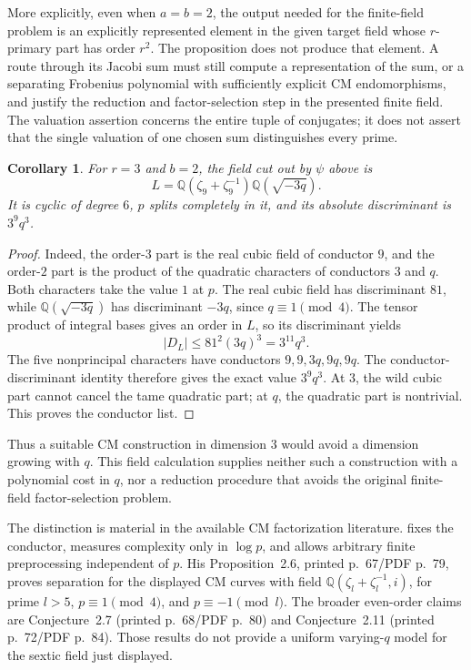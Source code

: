\documentclass[11pt]{article}
\newtheorem{corollary}[theorem]{Corollary}
\theoremstyle{definition}
\theoremstyle{remark}
\begin{document}
More explicitly, even when \(a=b=2\), the output needed for the
finite-field problem is an explicitly represented element in the
given target field whose \(r\)-primary part has order \(r^2\).
The proposition does not produce that element. A route through its
Jacobi sum must still compute a representation of the sum, or a
separating Frobenius polynomial with sufficiently explicit CM
endomorphisms, and justify the reduction and factor-selection step
in the presented finite field. The valuation assertion concerns
the entire tuple of conjugates; it does not assert that the single
valuation of one chosen sum distinguishes every prime.

\begin{corollary}\label{cor:sextic-cm-field}
For \(r=3\) and \(b=2\), the field cut out by \(\psi\) above is
\[
 L=\mathbb Q(\zeta_9+\zeta_9^{-1})
       \mathbb Q(\sqrt{-3q}).
\]
It is cyclic of degree \(6\), \(p\) splits completely in it, and
its absolute discriminant is \(3^9q^3\).
\end{corollary}
\begin{proof}
Indeed, the order-\(3\) part is the real cubic field of conductor
\(9\), and the order-\(2\) part is the product of the quadratic
characters of conductors \(3\) and \(q\). Both characters take
the value \(1\) at \(p\). The real cubic field has discriminant
\(81\), while \(\mathbb Q(\sqrt{-3q})\) has discriminant
\(-3q\), since \(q\equiv1\pmod4\). The tensor product of integral
bases gives an order in \(L\), so its discriminant yields
\[
 |D_L|\leq81^2(3q)^3=3^{11}q^3.
\]
The five nonprincipal characters have conductors
\(9,9,3q,9q,9q\). The conductor-discriminant identity therefore
gives the exact value \(3^9q^3\). At \(3\), the wild cubic
part cannot cancel the tame quadratic part; at \(q\), the
quadratic part is nontrivial. This proves the conductor list.
\end{proof}
Thus a suitable CM construction in dimension \(3\) would avoid a
dimension growing with \(q\). This field calculation supplies
neither such a construction with a polynomial cost in \(q\), nor
a reduction procedure that avoids the original finite-field
factor-selection problem.

The distinction is material in the available CM factorization
literature. \citet[Chapter~III, printed p.~50/PDF p.~62]{Boyer2014}
fixes the conductor, measures complexity only in \(\log p\), and
allows arbitrary finite preprocessing independent of \(p\).
His Proposition~2.6, printed p.~67/PDF p.~79, proves separation
for the displayed CM curves with field
\(\mathbb Q(\zeta_l+\zeta_l^{-1},i)\), for prime \(l>5\),
\(p\equiv1\pmod4\), and \(p\equiv-1\pmod l\).
The broader even-order claims are Conjecture~2.7
(printed p.~68/PDF p.~80) and Conjecture~2.11
(printed p.~72/PDF p.~84). Those results do not provide a uniform
varying-\(q\) model for the sextic field just displayed.
\end{document}
